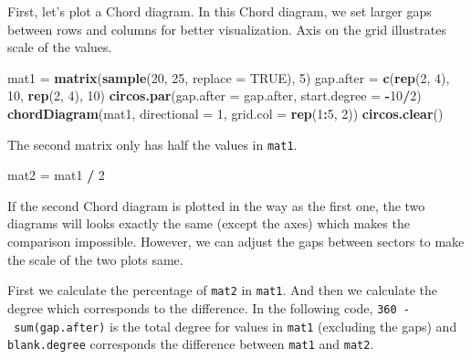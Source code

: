 \documentclass[]{book}
\newenvironment{Shaded}{\begin{snugshade}}{\end{snugshade}}
\newcommand{\KeywordTok}[1]{\textcolor[rgb]{0.13,0.29,0.53}{\textbf{#1}}}
\newcommand{\DataTypeTok}[1]{\textcolor[rgb]{0.13,0.29,0.53}{#1}}
\newcommand{\DecValTok}[1]{\textcolor[rgb]{0.00,0.00,0.81}{#1}}
\newcommand{\StringTok}[1]{\textcolor[rgb]{0.31,0.60,0.02}{#1}}
\newcommand{\OtherTok}[1]{\textcolor[rgb]{0.56,0.35,0.01}{#1}}
\newcommand{\OperatorTok}[1]{\textcolor[rgb]{0.81,0.36,0.00}{\textbf{#1}}}
\newcommand{\NormalTok}[1]{#1}
\theoremstyle{definition}
\theoremstyle{definition}
\theoremstyle{remark}
\begin{document}
First, let's plot a Chord diagram. In this Chord diagram, we set larger
gaps between rows and columns for better visualization. Axis on the grid
illustrates scale of the values.

\begin{Shaded}
\begin{Highlighting}[]
\NormalTok{mat1 =}\StringTok{ }\KeywordTok{matrix}\NormalTok{(}\KeywordTok{sample}\NormalTok{(}\DecValTok{20}\NormalTok{, }\DecValTok{25}\NormalTok{, }\DataTypeTok{replace =} \OtherTok{TRUE}\NormalTok{), }\DecValTok{5}\NormalTok{)}
\NormalTok{gap.after =}\StringTok{ }\KeywordTok{c}\NormalTok{(}\KeywordTok{rep}\NormalTok{(}\DecValTok{2}\NormalTok{, }\DecValTok{4}\NormalTok{), }\DecValTok{10}\NormalTok{, }\KeywordTok{rep}\NormalTok{(}\DecValTok{2}\NormalTok{, }\DecValTok{4}\NormalTok{), }\DecValTok{10}\NormalTok{)}
\KeywordTok{circos.par}\NormalTok{(}\DataTypeTok{gap.after =}\NormalTok{ gap.after, }\DataTypeTok{start.degree =} \OperatorTok{-}\DecValTok{10}\OperatorTok{/}\DecValTok{2}\NormalTok{)}
\KeywordTok{chordDiagram}\NormalTok{(mat1, }\DataTypeTok{directional =} \DecValTok{1}\NormalTok{, }\DataTypeTok{grid.col =} \KeywordTok{rep}\NormalTok{(}\DecValTok{1}\OperatorTok{:}\DecValTok{5}\NormalTok{, }\DecValTok{2}\NormalTok{))}
\KeywordTok{circos.clear}\NormalTok{()}
\end{Highlighting}
\end{Shaded}

The second matrix only has half the values in \texttt{mat1}.

\begin{Shaded}
\begin{Highlighting}[]
\NormalTok{mat2 =}\StringTok{ }\NormalTok{mat1 }\OperatorTok{/}\StringTok{ }\DecValTok{2}
\end{Highlighting}
\end{Shaded}

If the second Chord diagram is plotted in the way as the first one, the
two diagrams will looks exactly the same (except the axes) which makes
the comparison impossible. However, we can adjust the gaps between
sectors to make the scale of the two plots same.

First we calculate the percentage of \texttt{mat2} in \texttt{mat1}. And
then we calculate the degree which corresponds to the difference. In the
following code, \texttt{360\ -\ sum(gap.after)} is the total degree for
values in \texttt{mat1} (excluding the gaps) and \texttt{blank.degree}
corresponds the difference between \texttt{mat1} and \texttt{mat2}.
\end{document}
